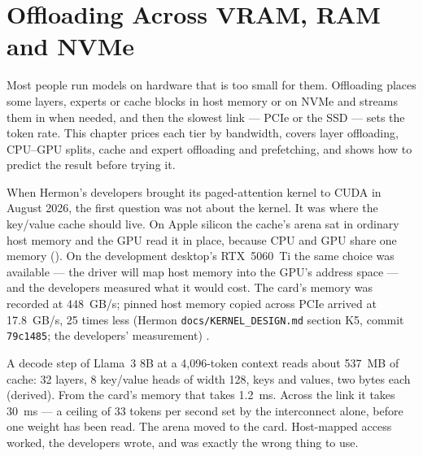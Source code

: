 \chapter{Offloading Across VRAM, RAM and NVMe}\label{ch:offloading}

\begin{ChapterIntent}
Most people run models on hardware that is too small for them. Offloading
places some layers, experts or cache blocks in host memory or on NVMe and
streams them in when needed, and then the slowest link --- PCIe or the SSD ---
sets the token rate. This chapter prices each tier by bandwidth, covers layer
offloading, CPU--GPU splits, cache and expert offloading and prefetching, and
shows how to predict the result before trying it.
\end{ChapterIntent}


When Hermon's developers brought its paged-attention kernel to CUDA in August
2026, the first question was not about the kernel. It was where the key/value
cache should live. On Apple silicon the cache's arena sat in ordinary host
memory and the GPU read it in place, because CPU and GPU share one memory
(). On the development desktop's RTX~5060~Ti the same
choice was available --- the driver will map host memory into the GPU's address
space --- and the developers measured what it would cost. The card's memory was
recorded at 448~GB/s; pinned host memory copied across PCIe arrived at
17.8~GB/s, 25 times less (Hermon \texttt{docs/KERNEL\_DESIGN.md} section K5,
commit \texttt{79c1485}; the developers' measurement)
.

A decode step of Llama~3 8B at a 4,096-token context reads about 537~MB of
cache: 32 layers, 8 key/value heads of width 128, keys and values, two bytes
each (derived). From the card's memory that takes 1.2~ms. Across the link it
takes 30~ms --- a ceiling of 33 tokens per second set by the interconnect alone,
before one weight has been read. The arena moved to the card. Host-mapped
access worked, the developers wrote, and was exactly the wrong thing to use.

